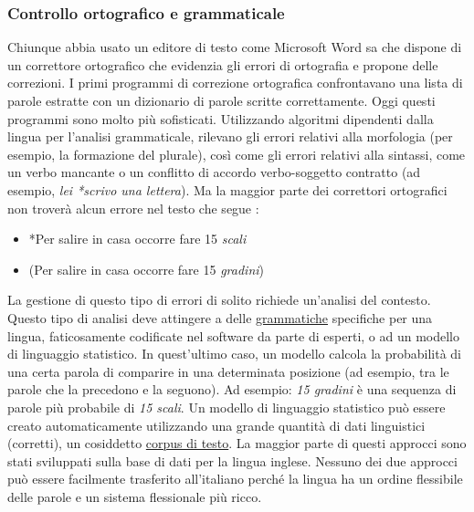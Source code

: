 \documentclass[]{../../metanetpaper}
\begin{document}
\begin{multicols}{2}
\subsubsection{Controllo ortografico e grammaticale}

Chiunque abbia usato un editore di testo come Microsoft Word sa che dispone di un correttore ortografico che evidenzia gli errori di ortografia e propone delle correzioni. I primi programmi di correzione ortografica confrontavano una lista di parole estratte con un dizionario di parole scritte correttamente. Oggi questi programmi sono molto pi\`{u} sofisticati. Utilizzando algoritmi dipendenti dalla lingua per l'analisi grammaticale, rilevano gli errori relativi alla morfologia (per esempio, la formazione del plurale), cos\`{i} come gli errori relativi alla sintassi, come un verbo mancante o un conflitto di accordo verbo-soggetto contratto (ad esempio, \emph{lei *scrivo una lettera}). Ma la maggior parte dei correttori ortografici non trover\`{a} alcun errore nel testo che segue \cite{zar1}:


\begin{itemize}
\item *Per salire in casa occorre fare 15 \emph{scali}
\item (Per salire in casa occorre fare 15 \emph{gradini})
\end{itemize}



La gestione di questo tipo di errori di solito richiede un'analisi del contesto.
Questo tipo di analisi deve attingere a delle \underline{ grammatiche} specifiche per una lingua, faticosamente codificate nel software da parte di esperti, o ad un modello di linguaggio statistico. In quest'ultimo caso, un modello calcola la probabilit\`{a} di una certa parola di comparire in una determinata posizione (ad esempio, tra le parole che la precedono e la seguono). Ad esempio: \emph{15 gradini} \`{e} una sequenza di parole pi\`{u} probabile di \emph{15 scali}. Un modello di linguaggio statistico pu\`{o} essere creato automaticamente utilizzando una grande quantit\`{a} di dati linguistici (corretti), un cosiddetto \underline{corpus di testo}. La maggior parte di questi approcci sono stati sviluppati sulla base di dati per la lingua inglese. Nessuno dei due approcci pu\`{o} essere facilmente trasferito all'italiano perch\'{e} la lingua ha un ordine flessibile delle parole e un sistema flessionale pi\`{u} ricco.


\end{multicols}
\end{document}
